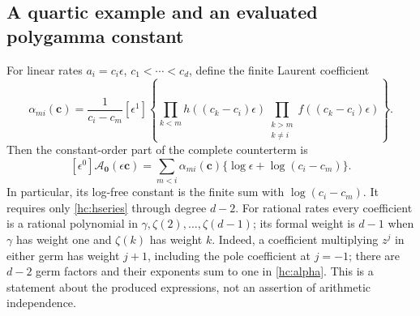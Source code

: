 \documentclass[11pt,a4paper]{article}
\numberwithin{equation}{section}
\theoremstyle{definition}
\theoremstyle{remark}
\begin{document}
\subsection{A quartic example and an evaluated polygamma constant}

For linear rates $a_i=c_i\epsilon$, $c_1<\cdots<c_d$, define the
finite Laurent coefficient
\begin{equation}\label{hc:alpha}
 \alpha_{mi}(\boldsymbol c)=\frac1{c_i-c_m}
 [\epsilon^1]\left\{
   \prod_{k<m}h((c_k-c_i)\epsilon)
   \prod_{\substack{k>m\\k\ne i}}f((c_k-c_i)\epsilon)
 \right\}.
\end{equation}
Then the constant-order part of the complete counterterm is
\begin{equation}\label{hc:linear-constant}
 [\epsilon^0]\mathcal A_{\boldsymbol0}(\epsilon\boldsymbol c)
 =\sum_{m<i}\alpha_{mi}(\boldsymbol c)
               \{\log\epsilon+\log(c_i-c_m)\}.
\end{equation}
In particular, its log-free constant is the finite sum with
$\log(c_i-c_m)$. It requires only \eqref{hc:hseries} through degree
$d-2$. For rational rates every coefficient is a rational polynomial
in $\gamma,\zeta(2),\ldots,\zeta(d-1)$; its formal weight is $d-1$
when $\gamma$ has weight one and $\zeta(k)$ has weight $k$.
Indeed, a coefficient multiplying $z^j$ in either germ has weight
$j+1$, including the pole coefficient at $j=-1$; there are $d-2$
germ factors and their exponents sum to one in \eqref{hc:alpha}.
This is a statement about the produced expressions, not an assertion
of arithmetic independence.
\end{document}
